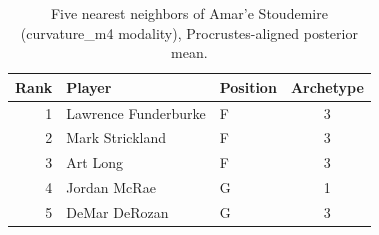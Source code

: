 \begin{table}[htbp]
  \centering\small
  \begin{tabular}{rllc}
    \toprule
    Rank & Player & Position & Archetype \\
    \midrule
    1 & Lawrence Funderburke & F & 3 \\
    2 & Mark Strickland & F & 3 \\
    3 & Art Long & F & 3 \\
    4 & Jordan McRae & G & 1 \\
    5 & DeMar DeRozan & G & 3 \\
    \bottomrule
  \end{tabular}
  \caption{Five nearest neighbors of Amar'e Stoudemire (curvature_m4 modality), Procrustes-aligned posterior mean.}
  \label{tab:Amar_e_Stoudemire_neighbors_curvature_m4}
\end{table}

